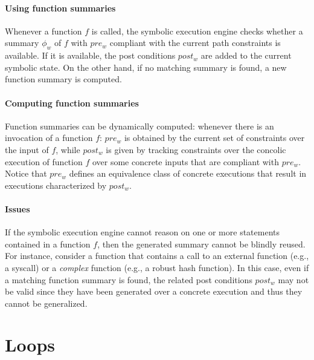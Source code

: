 \paragraph{Using function summaries} Whenever a function $f$ is called, the symbolic execution engine checks whether a summary $\phi_w$ of $f$ with $pre_w$ compliant with the current path constraints is available. If it is available, the post conditions $post_w$ are added to the current symbolic state. On the other hand, if no matching summary is found, a new function summary is computed.

\paragraph{Computing function summaries} Function summaries can be dynamically computed: whenever there is an invocation of a function $f$: $pre_w$ is obtained by the current set of constraints over the input of $f$, while $post_w$ is given by tracking constraints over the concolic execution of function $f$ over some concrete inputs that are compliant with $pre_w$. Notice that $pre_w$ defines an equivalence class of concrete executions that result in executions characterized by $post_w$. 

\paragraph{Issues} If the symbolic execution engine cannot reason on one or more statements contained in a function $f$, then the generated summary cannot be blindly reused. For instance, consider a function that contains a call to an external function (e.g., a syscall) or a {\em complex} function (e.g., a robust hash function). In this case, even if a matching function summary is found, the related post conditions $post_w$ may not be valid since they have been generated over a concrete execution and thus they cannot be generalized.




\section{Loops}
\label{se:loops}

